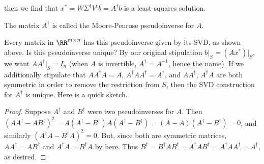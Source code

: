 then we find that $x^* = W\Sigma^{\dagger}V^tb = A^{\dagger}b$ is a least-squares solution. 

\begin{definition}

The matrix $A^{\dagger}$ is called the \ac{Moore-Penrose pseudoinverse} for $A$.
\end{definition}

Every matrix in $\RR^{m\times n}$ has this pseudoinverse given by its SVD, as shown above. Is this pseudoinverse unique? By our original stipulation $b\vert_S = (Ax^*)\vert_S$, we want $AA^{\dagger}\vert_S = I_n$ (when $A$ is invertible, $A^{\dagger}=A^{-1}$, hence the name). If we additionally stipulate that $AA^\dagger A = A$, $A^{\dagger}AA^{\dagger}=A^{\dagger}$, and $AA^{\dagger}$, $A^{\dagger}A$ are both symmetric in order to remove the restriction from $S$, then the SVD construction for $A^{\dagger}$ is unique. Here is a quick sketch. 

\begin{proof}
Suppose $A^{\dagger}$ and $B^{\dagger}$ were two pseudoinverses for $A$. Then $(AA^{\dagger}-AB^{\dagger})^2 = A(A^{\dagger}-B^{\dagger})A(A^{\dagger}-B^{\dagger}) = (A-A)(A^{\dagger}-B^{\dagger})=0$, and similarly $(A^{\dagger}A - B^{\dagger}A)^2=0$. But, since both are symmetric matrices, $AA^{\dagger}=AB^{\dagger}$ and $A^{\dagger}A=B^{\dagger}A$ by \href{https://math.stackexchange.com/questions/358488/a-symmetric-matrix-whose-square-is-zero}{here}. Thus $B^{\dagger} = B^{\dagger}AB^{\dagger} = A^{\dagger}AB^{\dagger} = A^{\dagger}AA^{\dagger} = A^{\dagger}$, as desired. 
\end{proof}

